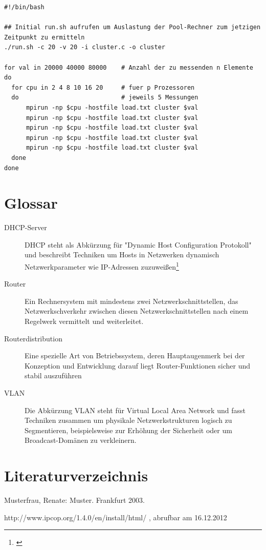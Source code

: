 \documentclass[a4paper,12pt]{scrartcl}
\begin{document}
\begin{lstlisting}[captionpos=b, caption=MPI BASH-Script: bench.sh, label=mpibenchsh]
#!/bin/bash

## Initial run.sh aufrufen um Auslastung der Pool-Rechner zum jetzigen Zeitpunkt zu ermitteln
./run.sh -c 20 -v 20 -i cluster.c -o cluster

for val in 20000 40000 80000	# Anzahl der zu messenden n Elemente
do
  for cpu in 2 4 8 10 16 20		# fuer p Prozessoren
  do							# jeweils 5 Messungen
	  mpirun -np $cpu -hostfile load.txt cluster $val
	  mpirun -np $cpu -hostfile load.txt cluster $val
	  mpirun -np $cpu -hostfile load.txt cluster $val
	  mpirun -np $cpu -hostfile load.txt cluster $val
	  mpirun -np $cpu -hostfile load.txt cluster $val
  done
done
\end{lstlisting}


\clearpage

\section{Glossar}
\begin{description}
 \item[DHCP-Server] DHCP steht als Abk\"urzung f\"ur "Dynamic Host
Configuration Protokoll" und beschreibt Techniken um Hosts in Netzwerken
dynamisch Netzwerkparameter wie IP-Adressen zuzuwei\ss{}en\footnote{\cite{dhcp}}
 \item[Router] Ein Rechnersystem mit mindestens zwei Netzwerkschnittstellen,
das Netzwerkschverkehr zwischen diesen Netzwerkschnittstellen nach einem
Regelwerk vermittelt und weiterleitet.
 \item[Routerdistribution] Eine spezielle Art von Betriebssystem, deren
Hauptaugenmerk bei der Konzeption und Entwicklung darauf liegt
Router-Funktionen sicher und stabil auszuf\"uhren
 \item[VLAN] Die Abk\"urzung VLAN steht f\"ur Virtual Local Area Network und
fasst Techniken zusammen um physikale Netzwerkstrukturen logisch zu
Segmentieren, beispielsweise zur Erh\"ohung der Sicherheit oder um
Broadcast-Dom\"anen zu verkleinern.
\end{description}
\clearpage

\section{Literaturverzeichnis}

Musterfrau, Renate: Muster. Frankfurt 2003.


\begin{thebibliography}{99}

 http://www.ipcop.org/1.4.0/en/install/html/ , abrufbar am
16.12.2012

\end{thebibliography}
\end{document}
